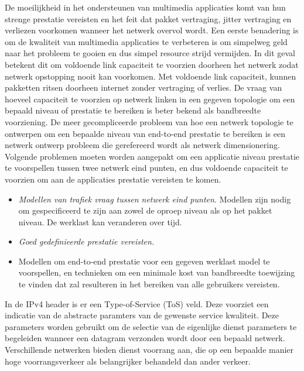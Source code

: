 De moeilijkheid in het ondersteunen van multimedia applicaties komt van hun strenge prestatie vereisten en het feit dat pakket vertraging, jitter vertraging en verliezen voorkomen wanneer het netwerk overvol wordt. Een eerste benadering is om de kwaliteit van multimedia applicaties te verbeteren is om simpelweg geld naar het probleem te gooien en dus simpel resource strijd vermijden. In dit geval betekent dit om voldoende link capaciteit te voorzien doorheen het netwerk zodat netwerk opstopping nooit kan voorkomen. Met voldoende link capaciteit, kunnen pakketten ritsen doorheen internet zonder vertraging of verlies.
De vraag van hoeveel capaciteit te voorzien op netwerk linken in een gegeven topologie om een bepaald niveau of prestatie te bereiken is beter bekend als bandbreedte voorziening. De meer gecompliceerde probleem van hoe een netwerk topologie te ontwerpen om een bepaalde niveau van end-to-end prestatie te bereiken is een netwerk ontwerp probleem die gerefereerd wordt als netwerk dimensionering. Volgende problemen moeten worden aangepakt om een applicatie niveau prestatie te voorspellen tussen twee netwerk eind punten, en dus voldoende capaciteit te voorzien om aan de applicaties prestatie vereisten te komen.
\begin{itemize}

\item	\textit{Modellen van trafiek vraag tussen netwerk eind punten.} Modellen zijn nodig om gespecificeerd te zijn aan zowel de oproep niveau als op het pakket niveau.  De werklast kan veranderen over tijd.
\item	\textit{Goed gedefinieerde prestatie vereisten.}
\item	Modellen om end-to-end prestatie voor een gegeven werklast model te voorspellen, en technieken om een minimale kost van bandbreedte toewijzing te vinden dat zal resulteren in het bereiken van alle gebruikers vereisten.
\end{itemize}

In de IPv4 header is er een Type-of-Service (ToS) veld. Deze voorziet een indicatie van de abstracte paramters van de gewenste service kwaliteit. Deze parameters worden gebruikt om de selectie van de eigenlijke dienst parameters te begeleiden wanneer een datagram verzonden wordt door een bepaald netwerk. Verschillende netwerken bieden dienst voorrang aan, die op een bepaalde manier hoge voorrangsverkeer als belangrijker behandeld dan ander verkeer.

\clearpage

